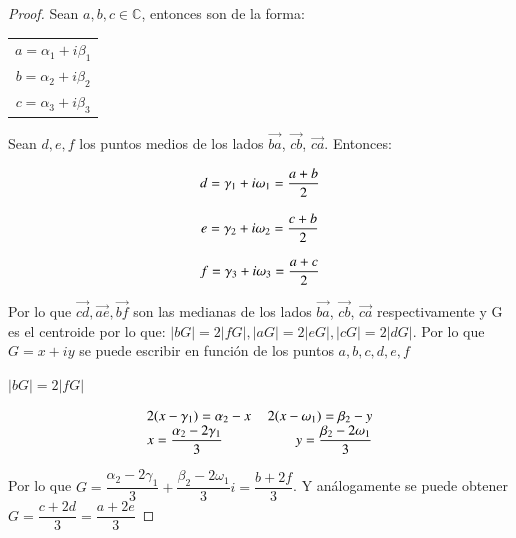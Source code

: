 \documentclass[11pt]{article}
\theoremstyle{Tema} \newtheorem{Tema}{Tema} %
\theoremstyle{Tema} \newtheorem{serie}{Serie}              %
\theoremstyle{Tema} \newtheorem{ejercicio}{Ejercicio}    %
\begin{document}
\begin{proof}
	


Sean $ a,b,c  \in \mathbb{C}$, entonces son de la forma:
\begin{center}
\begin{tabular}{c}
	$ a= \alpha_1+i\beta_1 $\\  
	$ b= \alpha_2+i\beta_2 $\\ 
	$ c= \alpha_3+i\beta_3 $\\ 
\end{tabular} 	
\end{center}

Sean $ d, e, f $ los puntos medios de los lados $ \vec{ba} $, $ \vec{cb} $, $ \vec{ca} $. Entonces:

\begin{center}
	\begin{equation}
	\begin{tabular}{c}
		$ d=\gamma_1+i\omega_1= \dfrac{a+b}{2} $\\
		\\  
		$ e= \gamma_2+i\omega_2=\dfrac{c+b}{2} $\\ 
		\\
		$ f=\gamma_3+i\omega_3= \dfrac{a+c}{2}$\\ 
	\end{tabular} 	
	\end{equation}
\end{center}

Por lo que $  \vec{cd} , \vec{ae},\vec{bf}$ son las medianas de los lados $ \vec{ba} $, $ \vec{cb} $, $ \vec{ca} $ respectivamente y G es el centroide por lo que: $|bG|=2|fG|, |aG|=2|eG|, |cG|=2|dG|   $. Por lo que $ G=x +iy $ se puede escribir en funci\'on de los puntos $ a,b,c,d,e,f$


$ |bG|=2|fG| $


\begin{center}
\begin{equation*}
\begin{tabular}{lr}
$2(x-\gamma_1)=\alpha_2-x $& $2(x-\omega_1)=\beta_2-y$\\
$ x=\dfrac{\alpha_2-2\gamma_1}{3} $&  $y=\dfrac{\beta_2-2\omega_1}{3}$\\
\end{tabular} 
\end{equation*}
\end{center}

Por lo que $ G=\dfrac{\alpha_2-2\gamma_1}{3}+ \dfrac{\beta_2-2\omega_1}{3}i= \dfrac{b+2f}{3} $. Y an\'alogamente se puede obtener $ G= \dfrac{c+2d}{3}=\dfrac{a+2e}{3}$



\end{proof}
\end{document}
